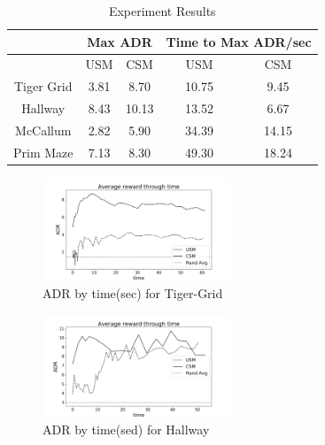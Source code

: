 \documentclass{article}
\begin{document}
\begin{table}[]
	  \caption{Experiment Results}
	\label{table:results}
	\centering
	\begin{tabular}{|c|c|c|c|c|}
		\hline
		& \multicolumn{2}{c|}{Max ADR} & \multicolumn{2}{c|}{Time to Max ADR/sec} \\ \hline
		& USM           & CSM          & USM                 & CSM                \\ \hline
		Tiger Grid &3.81              & 8.70            &10.75                   & 9.45                  \\ \hline
		Hallway    & 8.43             & 10.13             & 13.52                 & 6.67                  \\ \hline
		McCallum   & 2.82             &5.90          & 34.39                  & 14.15                 \\ \hline
		Prim Maze  &7.13            & 8.30           &49.30                   & 18.24                 \\ \hline
	\end{tabular}
\end{table}


\begin{figure}
	\centering
	\includegraphics[width=0.5\textwidth]{06-13-21-48/tiger_grid_result.png} %
	\caption{ADR by time(sec) for Tiger-Grid} %
	\label{fig:tiger_grid_result} %
\end{figure}

\begin{figure}
	\centering
	\includegraphics[width=0.5\textwidth]{06-13-21-48/hallway_result.png} %
	\caption{ADR by time(sed) for Hallway} %
	\label{fig:hallway_result} %
\end{figure}
\end{document}
